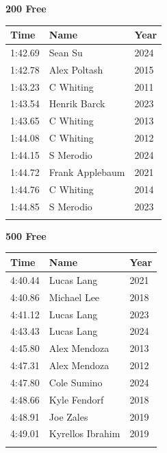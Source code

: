 \vspace{0.5em}
\noindent\begin{minipage}[t]{0.48\textwidth}
\centering
\textbf{\textcolor{teamprimary}{200 Free}}\par
\vspace{0.5em}
\centering
\small
\renewcommand{\arraystretch}{1.0}
\setlength{\tabcolsep}{4pt}
\begin{tabular}{@{}p{1.8cm}p{3.0cm}p{1.0cm}@{}}
\toprule
\textbf{Time} & \textbf{Name} & \textbf{Year} \\
\midrule
1:42.69 & Sean Su & 2024 \\
1:42.78 & Alex Poltash & 2015 \\
1:43.23 & C Whiting & 2011 \\
1:43.54 & Henrik Barck & 2023 \\
1:43.65 & C Whiting & 2013 \\
1:44.08 & C Whiting & 2012 \\
1:44.15 & S Merodio & 2024 \\
1:44.72 & Frank Applebaum & 2021 \\
1:44.76 & C Whiting & 2014 \\
1:44.85 & S Merodio & 2023 \\
\bottomrule
\vspace{0.5em}
\end{tabular}
\end{minipage}
\hfill
\begin{minipage}[t]{0.48\textwidth}
\centering
\textbf{\textcolor{teamprimary}{500 Free}}\par
\vspace{0.5em}
\centering
\small
\renewcommand{\arraystretch}{1.0}
\setlength{\tabcolsep}{4pt}
\begin{tabular}{@{}p{1.8cm}p{3.0cm}p{1.0cm}@{}}
\toprule
\textbf{Time} & \textbf{Name} & \textbf{Year} \\
\midrule
4:40.44 & Lucas Lang & 2021 \\
4:40.86 & Michael Lee & 2018 \\
4:41.12 & Lucas Lang & 2023 \\
4:43.43 & Lucas Lang & 2024 \\
4:45.80 & Alex Mendoza & 2013 \\
4:47.31 & Alex Mendoza & 2012 \\
4:47.80 & Cole Sumino & 2024 \\
4:48.66 & Kyle Fendorf & 2018 \\
4:48.91 & Joe Zales & 2019 \\
4:49.01 & Kyrellos Ibrahim & 2019 \\
\bottomrule
\vspace{0.5em}
\end{tabular}
\end{minipage}
